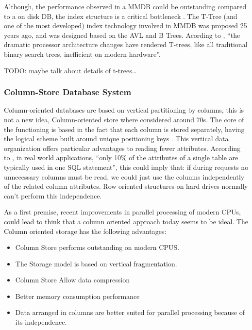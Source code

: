 \documentclass[12pt]{article} %
\begin{document}
Although, the performance observed in a MMDB could be outstanding compared to a on disk DB, the index structure is a critical bottleneck \cite{leisadaptive}. The T-Tree (and one of the most developed) index technology involved in MMDB was proposed 25 years ago, and was designed based on the AVL and B Trees. Acording to , ``the dramatic processor architecture changes have rendered T-trees, like all traditional binary search trees, inefficient on modern hardware''.

TODO: maybe talk about details of t-trees\ldots 


\subsubsection{Column-Store Database System}

Column-oriented databases are based on vertical partitioning by columns, this is not a new idea, Column-oriented store where considered around 70s. The core of the functioning is based in the fact that each column is stored separately, having the logical scheme built around unique positioning keys \cite{krueger2011main}. This vertical data organization offers particular advantages to reading fewer attributes. According to \cite{Plattner}, in real world applications, ``only 10\% of the attributes of a single table are typically used in one SQL statement'', this could imply that: if during requests no unnecessary columns must be read, we could just use the columns independently of the related column attributes. Row oriented structures on hard drives normally can't perform this independence.

As a first premise, recent improvements in parallel processing of modern CPUs, could lead to think that a column oriented approach today seems to be ideal. The Column oriented storage has the following advantages: 

\begin{itemize}
  \item Column Store performs outstanding on modern CPUS.

  \item The Storage model is based on vertical fragmentation.

  \item Column Store Allow data compression

  \item Better memory consumption performance

  \item Data arranged in columns are better suited for parallel processing because of its independence.

\end{itemize}
   
\end{document}
